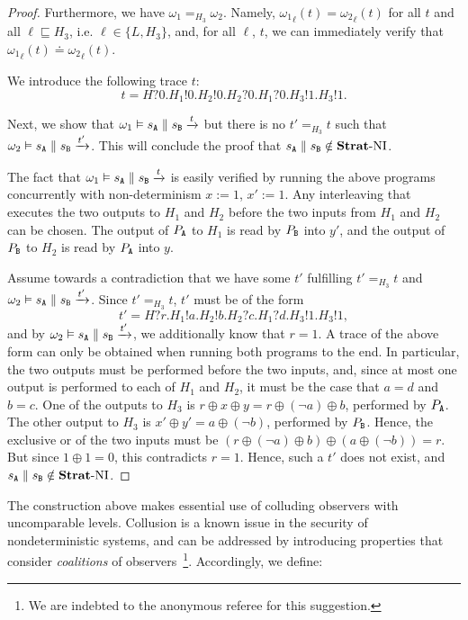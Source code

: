 \documentclass[preprint,5p,twocolumn]{elsarticle}
\begin{document}
\begin{proof}
  Furthermore, we have $\omega_1 =_{H_3} \omega_2$. Namely, ${\omega_1}_{\ell}(t) = {\omega_2}_{\ell}(t)$
  for all $t$ and all $\ell \sqsubseteq H_3$, i.e. $\ell \in \{L, H_3\}$,
  and, for all $\ell$, $t$, we can immediately verify that ${\omega_1}_{\ell}(t)\doteq {\omega_2}_{\ell}(t)$.

  We introduce the following trace $t$:
  $$t = H?0.H_1!0.H_2!0.H_2?0.H_1?0.H_3!1.H_3!1.$$

  Next, we show that $\omega_1 \vDash s_{\mathtt{A}} \parallel s_{\mathtt{B}} \xrightarrow{t}$ but there is no $t' =_{H_3} t$ such that
  $\omega_2 \vDash s_{\mathtt{A}} \parallel s_{\mathtt{B}} \xrightarrow{t'}$. This will conclude the proof that $s_{\mathtt{A}} \parallel s_{\mathtt{B}} \notin \mathbf{Strat}\text{-}\mathrm{NI}$.

  The fact that $\omega_1 \vDash s_{\mathtt{A}} \parallel s_{\mathtt{B}} \xrightarrow{t}$ is easily verified by running the above
  programs concurrently with non-determinism $x := 1$, $x' := 1$. Any interleaving that executes the two outputs to $H_1$ and $H_2$
  before the two inputs from $H_1$ and $H_2$ can be chosen. The output of $P_{\mathtt{A}}$ to $H_1$ is read
  by $P_{\mathtt{B}}$ into $y'$, and the output of $P_{\mathtt{B}}$ to $H_2$ is read by $P_{\mathtt{A}}$  into $y$.

  Assume towards a contradiction that we have some $t'$ fulfilling $t' =_{H_3} t$
  and $\omega_2 \vDash s_{\mathtt{A}} \parallel s_{\mathtt{B}} \xrightarrow{t'}$. Since $t' =_{H_3} t$, $t'$ must
  be of the form
  $$t' = H?r.H_1!a.H_2!b.H_2?c.H_1?d.H_3!1.H_3!1,$$
  and by $\omega_2 \vDash s_{\mathtt{A}} \parallel s_{\mathtt{B}} \xrightarrow{t'}$, we additionally know that $r = 1$.
  A trace of the above form can only be obtained when running both programs to the end. In
  particular, the two outputs must be performed before the two inputs, and, since at most
  one output is performed to each of $H_1$ and $H_2$, it must be the case that $a = d$ and $b = c$.
  One of the outputs to $H_3$ is $r \oplus x \oplus y = r \oplus (\neg a) \oplus b$, performed
  by $P_{\mathtt{A}}$. The other output to $H_3$ is $x' \oplus y' = a \oplus (\neg b)$, performed by $P_{\mathtt{B}}$.
  Hence, the exclusive or of the two inputs must be $(r \oplus (\neg a) \oplus b) \oplus (a \oplus (\neg b))=r$. But since $1 \oplus 1 = 0$, this contradicts $r = 1$. Hence, such a $t'$ does
  not exist, and $s_{\mathtt{A}} \parallel s_{\mathtt{B}} \notin \mathbf{Strat}\text{-}\mathrm{NI}$.
  
\end{proof}

The construction above makes essential use of colluding observers with
uncomparable levels. Collusion is a known issue in the security of nondeterministic
systems, and can be addressed by introducing properties that consider \emph{coalitions}
of observers~\cite{Engelhardt2012,Muller2018}\footnote{We are indebted to the anonymous referee for this suggestion.}.
Accordingly, we define:
\end{document}
